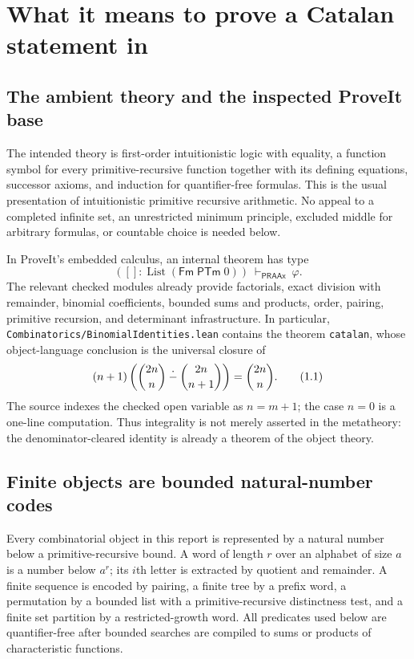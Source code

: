\section{What it means to prove a Catalan statement in \ipra}
\label{sec:foundations}

\subsection{The ambient theory and the inspected ProveIt base}

The intended theory is first-order intuitionistic logic with equality, a
function symbol for every primitive-recursive function together with its
defining equations, successor axioms, and induction for quantifier-free
formulas.  This is the usual presentation of intuitionistic primitive
recursive arithmetic.  No appeal to a completed infinite set, an unrestricted
minimum principle, excluded middle for arbitrary formulas, or countable choice
is needed below.

In ProveIt's embedded calculus, an internal theorem has type
\[
  ([]:\operatorname{List}(\mathsf{Fm}\;\mathsf{PTm}\;0))
  \ \vdash_{\mathsf{PRAAx}}\ \varphi.
\]
The relevant checked modules already provide factorials, exact division with
remainder, binomial coefficients, bounded sums and products, order,
pairing, primitive recursion, and determinant infrastructure.  In particular,
\texttt{Combinatorics/BinomialIdentities.lean} contains the theorem
\texttt{catalan}, whose object-language conclusion is the universal closure of
\[
 (n+1)\left(\binom{2n}{n}\mathbin{\mathop{\dot{-}}}\binom{2n}{n+1}\right)
   =\binom{2n}{n}.
\tag{1.1}\label{eq:checked-catalan}
\]
The source indexes the checked open variable as $n=m+1$; the case $n=0$ is a
one-line computation.  Thus integrality is not merely asserted in the
metatheory: the denominator-cleared identity is already a theorem of the
object theory.

\subsection{Finite objects are bounded natural-number codes}

Every combinatorial object in this report is represented by a natural number
below a primitive-recursive bound.  A word of length $r$ over an alphabet of
size $a$ is a number below $a^r$; its $i$th letter is extracted by quotient and
remainder.  A finite sequence is encoded by pairing, a finite tree by a prefix
word, a permutation by a bounded list with a primitive-recursive distinctness
test, and a finite set partition by a restricted-growth word.  All predicates
used below are quantifier-free after bounded searches are compiled to sums or
products of characteristic functions.

